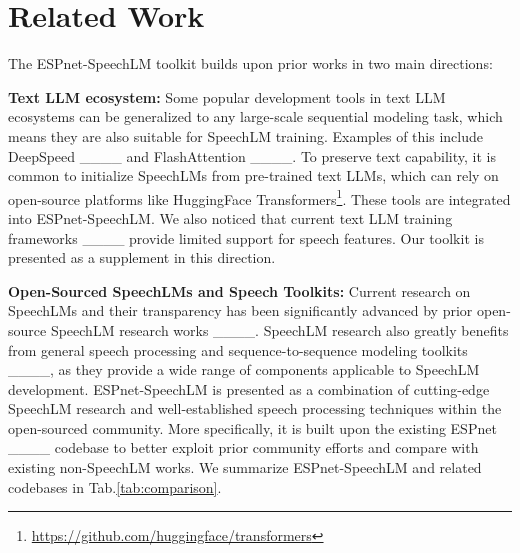 \section{Related Work}
\label{related_work}
\vspace{-3pt}

The ESPnet-SpeechLM toolkit builds upon prior works in two main directions:

\noindent\textbf{Text LLM ecosystem:} 
Some popular development tools in text LLM ecosystems can be generalized to any large-scale sequential modeling task, which means they are also suitable for SpeechLM training. Examples of this include DeepSpeed ____ and FlashAttention ____.
To preserve text capability, it is common to initialize SpeechLMs from pre-trained text LLMs, which can rely on open-source platforms like HuggingFace Transformers\footnote{\url{https://github.com/huggingface/transformers}}. These tools are integrated into ESPnet-SpeechLM. 
We also noticed that current text LLM training frameworks ____ provide limited support for speech features. Our toolkit is presented as a supplement in this direction.

\noindent\textbf{Open-Sourced SpeechLMs and Speech Toolkits:} Current research on SpeechLMs and their transparency has been significantly advanced by prior open-source SpeechLM research works ____.
SpeechLM research also greatly benefits from general speech processing and sequence-to-sequence modeling toolkits ____, as they provide a wide range of components applicable to SpeechLM development. 
ESPnet-SpeechLM is presented as a combination of cutting-edge SpeechLM research and well-established speech processing techniques within the open-sourced community. 
More specifically, it is built upon the existing ESPnet ____ codebase to better exploit prior community efforts and compare with existing non-SpeechLM works.
We summarize ESPnet-SpeechLM and related codebases in Tab.\ref{tab:comparison}.



